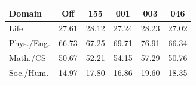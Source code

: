 \centering
{}
\begingroup
\scriptsize{}
\setlength{\tabcolsep}{1pt}
\renewcommand{\arraystretch}{1.5}
\begin{tabular*}{\linewidth}{@{\extracolsep{\fill}}lccccc@{}}
\toprule
Domain & Off & 155 & 001 & 003 & 046 \\
\midrule
Life & \shortstack{27.61\\{\fontsize{6}{7}\selectfont [9.41, 46.54]}} & \shortstack{28.12\\{\fontsize{6}{7}\selectfont [9.85, 47.09]}} & \shortstack{27.24\\{\fontsize{6}{7}\selectfont [9.07, 46.10]}} & \shortstack{28.23\\{\fontsize{6}{7}\selectfont [7.29, 49.68]}} & \shortstack{27.02\\{\fontsize{6}{7}\selectfont [8.50, 47.30]}} \\
Phys./Eng. & \shortstack{66.73\\{\fontsize{6}{7}\selectfont [58.70, 74.25]}} & \shortstack{67.25\\{\fontsize{6}{7}\selectfont [59.68, 74.42]}} & \shortstack{69.71\\{\fontsize{6}{7}\selectfont [62.31, 76.54]}} & \shortstack{76.91\\{\fontsize{6}{7}\selectfont [64.40, 87.98]}} & \shortstack{66.34\\{\fontsize{6}{7}\selectfont [55.83, 76.16]}} \\
Math./CS & \shortstack{50.67\\{\fontsize{6}{7}\selectfont [43.72, 57.35]}} & \shortstack{52.21\\{\fontsize{6}{7}\selectfont [45.38, 58.65]}} & \shortstack{54.15\\{\fontsize{6}{7}\selectfont [47.30, 60.71]}} & \shortstack{57.29\\{\fontsize{6}{7}\selectfont [54.67, 59.50]}} & \shortstack{50.76\\{\fontsize{6}{7}\selectfont [43.61, 58.19]}} \\
Soc./Hum. & \shortstack{14.97\\{\fontsize{6}{7}\selectfont [8.33, 18.33]}} & \shortstack{17.80\\{\fontsize{6}{7}\selectfont [12.10, 24.89]}} & \shortstack{16.86\\{\fontsize{6}{7}\selectfont [9.98, 26.52]}} & \shortstack{19.60\\{\fontsize{6}{7}\selectfont [13.47, 27.30]}} & \shortstack{18.35\\{\fontsize{6}{7}\selectfont [13.00, 24.17]}} \\

\end{tabular*}
